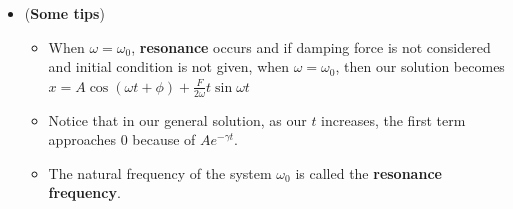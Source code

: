 \documentclass[10pt, landscape]{article}
\begin{document}
\begin{multicols}{4}
\begin{enumerate}
\begin{itemize}
        \item (\textbf{Some tips})
        \begin{itemize}
            \item When $\omega = \omega_0$, \textbf{resonance} occurs and if damping force is not considered and initial condition is not given, when $\omega = \omega_0$, then our solution becomes $x=A\cos(\omega t+\phi)+\frac{F}{2\omega}t\sin\omega t$
            \item Notice that in our general solution, as our $t$ increases, the first term approaches 0 because of $Ae^{-\gamma t}$.
            \item The natural frequency of the system $\omega_0$ is called the \textbf{resonance frequency}.
        \end{itemize}
    \end{itemize}
\end{enumerate}
\end{multicols}

\hrulefill \\

\begin{multicols}{3}
\end{multicols}
\end{document}
